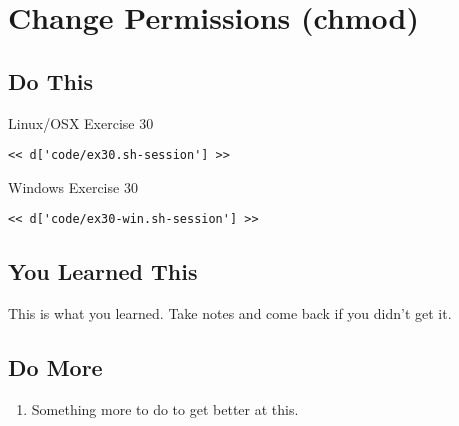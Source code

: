 \chapter{Change Permissions (chmod)}

\section{Do This}

\begin{code}{Linux/OSX Exercise 30}
\begin{Verbatim}
<< d['code/ex30.sh-session'] >>
\end{Verbatim}
\end{code}

\begin{code}{Windows Exercise 30}
\begin{Verbatim}
<< d['code/ex30-win.sh-session'] >>
\end{Verbatim}
\end{code}

\section{You Learned This}

This is what you learned.  Take notes and come back if you didn't get it.

\section{Do More}

\begin{enumerate}
\item Something more to do to get better at this.
\end{enumerate}


